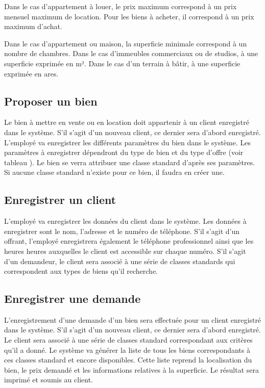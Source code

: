 Dans le cas d'appartement à louer, le prix maximum correspond à un prix mensuel maximum de location. Pour les biens à acheter, il correspond à un prix maximum d'achat.

Dans le cas d'appartement ou maison, la superficie minimale correspond à un nombre de chambres. Dans le cas d'immeubles commerciaux ou de studios, à une superficie exprimée en m². Dans le cas d'un terrain à bâtir, à une superficie exprimée en ares.

\subsection{Proposer un bien}

Le bien à mettre en vente ou en location doit appartenir à un client enregistré dans le système. S'il s'agit d'un nouveau client, ce dernier sera d'abord enregistré. L'employé va enregistrer les différents paramètres du bien dans le système. Les paramètres à enregistrer dépendront du type de bien et du type d'offre (voir tableau ). Le bien se verra attribuer une classe standard d'après ses paramètres. Si aucune classe standard n'existe pour ce bien, il faudra en créer une.

\subsection{Enregistrer un client}

L'employé va enregistrer les données du client dans le système. Les données à enregistrer sont le nom, l'adresse et le numéro de téléphone. S'il s'agit d'un offrant, l'employé enregistrera également le téléphone professionnel ainsi que les heures heures auxquelles le client est accessible sur chaque numéro. S'il s'agit d'un demandeur, le client sera associé à une série de classes standards qui correspondent aux types de biens qu'il recherche.

\subsection{Enregistrer une demande}

L'enregistrement d'une demande d'un bien sera effectuée pour un client enregistré dans le système. S'il s'agit d'un nouveau client, ce dernier sera d'abord enregistré. Le client sera associé à une série de classes standard correspondant aux critères qu'il a donné. Le système va générer la liste de tous les biens correspondants à ces classes standard et encore disponibles. Cette liste reprend la localisation du bien, le prix demandé et les informations relatives à la superficie. Le résultat sera imprimé et soumis au client.


